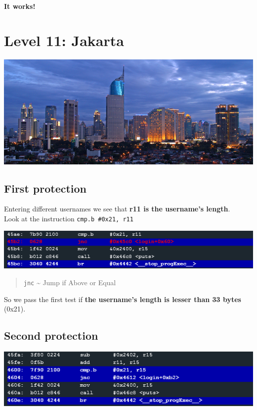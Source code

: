 \documentclass[a4paper,11pt]{article}
\begin{document}
\textbf{It works!}

\section{Level 11: Jakarta}\label{level-11-jakarta}

\includegraphics{img/11_6.PNG}

\subsection{First protection}\label{first-protection-1}

Entering different usernames we see that \textbf{r11 is the username's
length}.\\Look at the instruction \texttt{cmp.b \#0x21, r11}

\includegraphics{img/11_1.PNG}

\begin{quote}
\texttt{jnc} \textasciitilde{} Jump if Above or Equal
\end{quote}

So we pass the first test if \textbf{the username's length is lesser
than 33 bytes} (0x21).

\subsection{Second protection}\label{second-protection-1}

\includegraphics{img/11_2.PNG}
\end{document}
